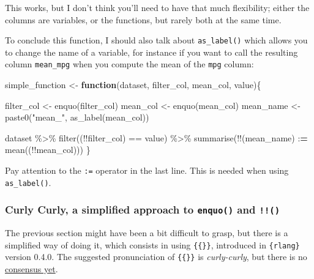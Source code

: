 \documentclass[
]{article}
\newenvironment{Shaded}{\begin{snugshade}}{\end{snugshade}}
\newcommand{\ControlFlowTok}[1]{\textcolor[rgb]{0.13,0.29,0.53}{\textbf{#1}}}
\newcommand{\ErrorTok}[1]{\textcolor[rgb]{0.64,0.00,0.00}{\textbf{#1}}}
\newcommand{\FunctionTok}[1]{\textcolor[rgb]{0.00,0.00,0.00}{#1}}
\newcommand{\NormalTok}[1]{#1}
\newcommand{\OtherTok}[1]{\textcolor[rgb]{0.56,0.35,0.01}{#1}}
\newcommand{\SpecialCharTok}[1]{\textcolor[rgb]{0.00,0.00,0.00}{#1}}
\newcommand{\StringTok}[1]{\textcolor[rgb]{0.31,0.60,0.02}{#1}}
\begin{document}
This works, but I don't think you'll need to have that much flexibility; either the columns
are variables, or the functions, but rarely both at the same time.

To conclude this function, I should also talk about \texttt{as\_label()} which allows you to change the
name of a variable, for instance if you want to call the resulting column \texttt{mean\_mpg} when you
compute the mean of the \texttt{mpg} column:

\begin{Shaded}
\begin{Highlighting}[]
\NormalTok{simple\_function }\OtherTok{\textless{}{-}} \ControlFlowTok{function}\NormalTok{(dataset, filter\_col, mean\_col, value)\{}

\NormalTok{  filter\_col }\OtherTok{\textless{}{-}} \FunctionTok{enquo}\NormalTok{(filter\_col)}
\NormalTok{  mean\_col }\OtherTok{\textless{}{-}} \FunctionTok{enquo}\NormalTok{(mean\_col)}
\NormalTok{  mean\_name }\OtherTok{\textless{}{-}} \FunctionTok{paste0}\NormalTok{(}\StringTok{"mean\_"}\NormalTok{, }\FunctionTok{as\_label}\NormalTok{(mean\_col))}
  
\NormalTok{  dataset }\SpecialCharTok{\%\textgreater{}\%}
    \FunctionTok{filter}\NormalTok{((}\SpecialCharTok{!!}\NormalTok{filter\_col) }\SpecialCharTok{==}\NormalTok{ value) }\SpecialCharTok{\%\textgreater{}\%}
    \FunctionTok{summarise}\NormalTok{(}\SpecialCharTok{!!}\NormalTok{(mean\_name) }\SpecialCharTok{:}\ErrorTok{=} \FunctionTok{mean}\NormalTok{((}\SpecialCharTok{!!}\NormalTok{mean\_col)))}
\NormalTok{\}}
\end{Highlighting}
\end{Shaded}

Pay attention to the \texttt{:=} operator in the last line. This is needed when using \texttt{as\_label()}.

\hypertarget{curly-curly-a-simplified-approach-to-enquo-and}{%
\subsubsection{\texorpdfstring{Curly Curly, a simplified approach to \texttt{enquo()} and \texttt{!!()}}{Curly Curly, a simplified approach to enquo() and !!()}}\label{curly-curly-a-simplified-approach-to-enquo-and}}

The previous section might have been a bit difficult to grasp, but there is a simplified way of doing it,
which consists in using \texttt{\{\{\}\}}, introduced in \texttt{\{rlang\}} version 0.4.0.
The suggested pronunciation of \texttt{\{\{\}\}} is \emph{curly-curly}, but there is no
\href{https://twitter.com/JonTheGeek/status/1144815369766547456}{consensus yet}.
\end{document}
